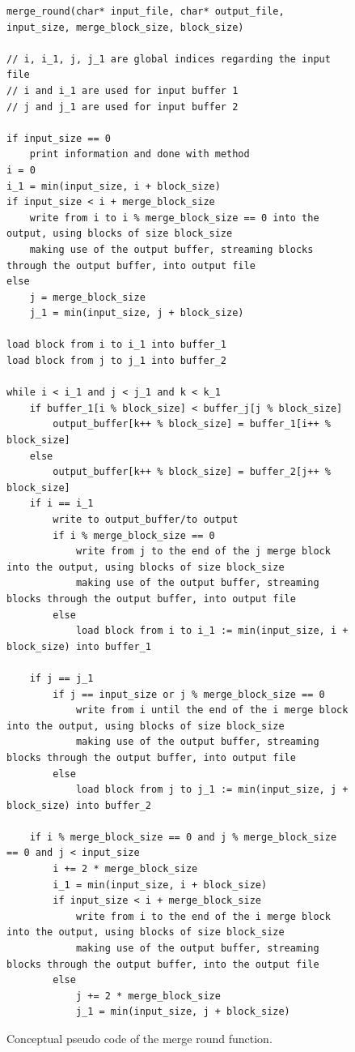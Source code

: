 \documentclass[twocolumn]{article}
\begin{document}
\begin{figure}
	\begin{center}
		\small
		\begin{lstlisting}
merge_round(char* input_file, char* output_file, input_size, merge_block_size, block_size)

// i, i_1, j, j_1 are global indices regarding the input file
// i and i_1 are used for input buffer 1
// j and j_1 are used for input buffer 2

if input_size == 0
	print information and done with method
i = 0
i_1 = min(input_size, i + block_size)
if input_size < i + merge_block_size 
	write from i to i % merge_block_size == 0 into the output, using blocks of size block_size
	making use of the output buffer, streaming blocks through the output buffer, into output file
else
	j = merge_block_size
	j_1 = min(input_size, j + block_size)

load block from i to i_1 into buffer_1
load block from j to j_1 into buffer_2

while i < i_1 and j < j_1 and k < k_1
	if buffer_1[i % block_size] < buffer_j[j % block_size]
		output_buffer[k++ % block_size] = buffer_1[i++ % block_size]
	else
		output_buffer[k++ % block_size] = buffer_2[j++ % block_size]
	if i == i_1
		write to output_buffer/to output
		if i % merge_block_size == 0
			write from j to the end of the j merge block into the output, using blocks of size block_size
			making use of the output buffer, streaming blocks through the output buffer, into output file 
		else
			load block from i to i_1 := min(input_size, i + block_size) into buffer_1
	
	if j == j_1
		if j == input_size or j % merge_block_size == 0
			write from i until the end of the i merge block into the output, using blocks of size block_size
			making use of the output buffer, streaming blocks through the output buffer, into output file 
		else
			load block from j to j_1 := min(input_size, j + block_size) into buffer_2
	
	if i % merge_block_size == 0 and j % merge_block_size == 0 and j < input_size
		i += 2 * merge_block_size
		i_1 = min(input_size, i + block_size)
		if input_size < i + merge_block_size 
			write from i to the end of the i merge block into the output, using blocks of size block_size
			making use of the output buffer, streaming blocks through the output buffer, into the output file
		else 
			j += 2 * merge_block_size
			j_1 = min(input_size, j + block_size)
\end{lstlisting}
		\normalsize
	\end{center}
	\caption{Conceptual pseudo code of the merge round function.}
	\label{fig:merge_round_pseudo_code}
\end{figure}
\end{document}
